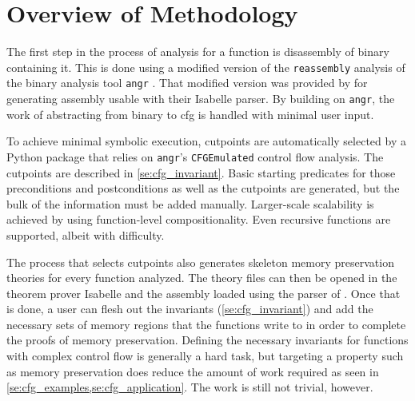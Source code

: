 \section{Overview of Methodology}\label{se:cfg_overview}
The first step in the process of analysis for a function
is disassembly of  binary containing it.
This is done using a modified version of the \lstinline|reassembly| analysis
\autocite{wang2017ramblr} of the binary analysis tool \texttt{angr} \autocite{shoshitaishvili2016state,wang2017angr}.%
That modified version was provided by \textcite{roessle2019}
for generating assembly usable with their Isabelle parser.%
By building on \texttt{angr},
the work of abstracting from binary to \ac{cfg} is handled with minimal user input.

To achieve minimal symbolic execution, cutpoints%
are automatically selected by a Python package that relies on
\texttt{angr}'s \lstinline|CFGEmulated| control flow analysis.%
The cutpoints are described in \cref{se:cfg_invariant}.
Basic starting predicates for those preconditions and postconditions%
%
as well as the cutpoints are generated,
but the bulk of the information must be added manually.
Larger-scale scalability is achieved by using function-level compositionality.
Even recursive functions are supported, albeit with difficulty.%

The process that selects cutpoints%
also generates skeleton memory preservation theories for every function analyzed.
The theory files can then be opened in the theorem prover Isabelle
and the assembly loaded using the parser of \textcite{roessle2019}.
Once that is done, a user can flesh out the invariants (\cref{se:cfg_invariant})
and add the necessary sets of memory regions that the functions write to
in order to complete the proofs of memory preservation.
Defining the necessary invariants for functions with complex control flow
is generally a hard task, but targeting a property such as memory preservation
does reduce the amount of work required
as seen in \cref{se:cfg_examples,se:cfg_application}.
The work is still not trivial, however.

